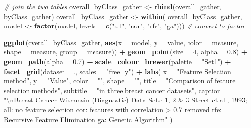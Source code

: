 \documentclass[]{book}
\newenvironment{Shaded}{\begin{snugshade}}{\end{snugshade}}
\newcommand{\CharTok}[1]{\textcolor[rgb]{0.31,0.60,0.02}{#1}}
\newcommand{\CommentTok}[1]{\textcolor[rgb]{0.56,0.35,0.01}{\textit{#1}}}
\newcommand{\DataTypeTok}[1]{\textcolor[rgb]{0.13,0.29,0.53}{#1}}
\newcommand{\DecValTok}[1]{\textcolor[rgb]{0.00,0.00,0.81}{#1}}
\newcommand{\FloatTok}[1]{\textcolor[rgb]{0.00,0.00,0.81}{#1}}
\newcommand{\KeywordTok}[1]{\textcolor[rgb]{0.13,0.29,0.53}{\textbf{#1}}}
\newcommand{\NormalTok}[1]{#1}
\newcommand{\OperatorTok}[1]{\textcolor[rgb]{0.81,0.36,0.00}{\textbf{#1}}}
\newcommand{\StringTok}[1]{\textcolor[rgb]{0.31,0.60,0.02}{#1}}
\begin{document}
\begin{Shaded}
\begin{Highlighting}[]
\CommentTok{# join the two tables}
\NormalTok{overall_byClass_gather <-}\StringTok{ }\KeywordTok{rbind}\NormalTok{(overall_gather, byClass_gather)}
\NormalTok{overall_byClass_gather <-}\StringTok{ }\KeywordTok{within}\NormalTok{(}
\NormalTok{  overall_byClass_gather, model <-}\StringTok{ }\KeywordTok{factor}\NormalTok{(model, }
                                          \DataTypeTok{levels =} \KeywordTok{c}\NormalTok{(}\StringTok{"all"}\NormalTok{, }\StringTok{"cor"}\NormalTok{, }\StringTok{"rfe"}\NormalTok{, }\StringTok{"ga"}\NormalTok{)))  }
                                          \CommentTok{# convert to factor}

\KeywordTok{ggplot}\NormalTok{(overall_byClass_gather, }\KeywordTok{aes}\NormalTok{(}\DataTypeTok{x =}\NormalTok{ model, }\DataTypeTok{y =}\NormalTok{ value, }\DataTypeTok{color =}\NormalTok{ measure, }
                                   \DataTypeTok{shape =}\NormalTok{ measure, }\DataTypeTok{group =}\NormalTok{ measure)) }\OperatorTok{+}
\StringTok{  }\KeywordTok{geom_point}\NormalTok{(}\DataTypeTok{size =} \DecValTok{4}\NormalTok{, }\DataTypeTok{alpha =} \FloatTok{0.8}\NormalTok{) }\OperatorTok{+}
\StringTok{  }\KeywordTok{geom_path}\NormalTok{(}\DataTypeTok{alpha =} \FloatTok{0.7}\NormalTok{) }\OperatorTok{+}
\StringTok{  }\KeywordTok{scale_colour_brewer}\NormalTok{(}\DataTypeTok{palette =} \StringTok{"Set1"}\NormalTok{) }\OperatorTok{+}
\StringTok{  }\KeywordTok{facet_grid}\NormalTok{(dataset }\OperatorTok{~}\StringTok{ }\NormalTok{., }\DataTypeTok{scales =} \StringTok{"free_y"}\NormalTok{) }\OperatorTok{+}
\StringTok{  }\KeywordTok{labs}\NormalTok{(}
    \DataTypeTok{x =} \StringTok{"Feature Selection method"}\NormalTok{,}
    \DataTypeTok{y =} \StringTok{"Value"}\NormalTok{,}
    \DataTypeTok{color =} \StringTok{""}\NormalTok{,}
    \DataTypeTok{shape =} \StringTok{""}\NormalTok{,}
    \DataTypeTok{title =} \StringTok{"Comparison of feature selection methods"}\NormalTok{,}
    \DataTypeTok{subtitle =} \StringTok{"in three breast cancer datasets"}\NormalTok{,}
    \DataTypeTok{caption =} \StringTok{"}\CharTok{\textbackslash{}n}\StringTok{Breast Cancer Wisconsin (Diagnostic) Data Sets: 1, 2 & 3}
\StringTok{    Street et al., 1993;}
\StringTok{    all: no feature selection}
\StringTok{    cor: features with correlation > 0.7 removed}
\StringTok{    rfe: Recursive Feature Elimination}
\StringTok{    ga: Genetic Algorithm"}
\NormalTok{  )}
\end{Highlighting}
\end{Shaded}
\end{document}
